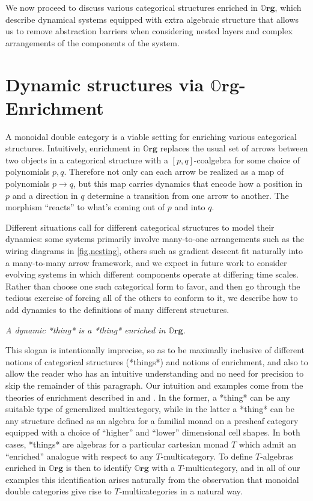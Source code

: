 \documentclass[11pt, one side, article]{memoir}
\theoremstyle{definition}
\theoremstyle{plain}
\newcommand{\Cat}[1]{\mathbf{#1}}%
\newcommand{\0}{\textsf{0}}
\newcommand{\1}{\tn{\textsf{1}}}
\newcommand{\slogan}[1]{\begin{center}\textit{#1}\end{center}}
\newcommand{\org}{{\mathbb{O}\Cat{rg}}}
\begin{document}
We now proceed to discuss various categorical structures enriched in $\org$, which describe dynamical systems equipped with extra algebraic structure that allows us to remove abstraction barriers when considering nested layers and complex arrangements of the components of the system.


\chapter{Dynamic structures via $\org$-Enrichment}


A monoidal double category is a viable setting for enriching various categorical structures. Intuitively, enrichment in $\org$ replaces the usual set of arrows between two objects in a categorical structure with a $[p,q]$-coalgebra for some choice of polynomials $p,q$. Therefore not only can each arrow be realized as a map of polynomials $p \to q$, but this map carries dynamics that encode how a position in $p$ and a direction in $q$ determine a transition from one arrow to another. The morphism ``reacts'' to what's coming out of $p$ and into $q$.

Different situations call for different categorical structures to model their dynamics: some systems primarily involve many-to-one arrangements such as the wiring diagrams in \cref{fig.nesting}, others such as gradient descent fit naturally into a many-to-many arrow framework, and we expect in future work to consider evolving systems in which different components operate at differing time scales. Rather than choose one such categorical form to favor, and then go through the tedious exercise of forcing all of the others to conform to it, we describe how to add dynamics to the definitions of many different structures.

\slogan{A dynamic *thing* is a *thing* enriched in $\org$.}

This slogan is intentionally imprecise, so as to be maximally inclusive of different notions of categorical structures  (*things*) and notions of enrichment, and also to allow the reader who has an intuitive understanding and no need for precision to skip the remainder of this paragraph. Our intuition and examples come from the theories of enrichment described in \cite{leinster1999generalized} and \cite{shapiro2022enrichment}. In the former, a *thing* can be any suitable type of generalized multicategory, while in the latter a *thing* can be any structure defined as an algebra for a familial monad on a presheaf category equipped with a choice of ``higher'' and ``lower'' dimensional cell shapes. In both cases, *things* are algebras for a particular cartesian monad $T$ which admit an ``enriched'' analogue with respect to any $T$-multicategory. To define $T$-algebras enriched in $\org$ is then to identify $\org$ with a $T$-multicategory, and in all of our examples this identification arises naturally from the observation that monoidal double categories give rise to $T$-multicategories in a natural way.
\end{document}
